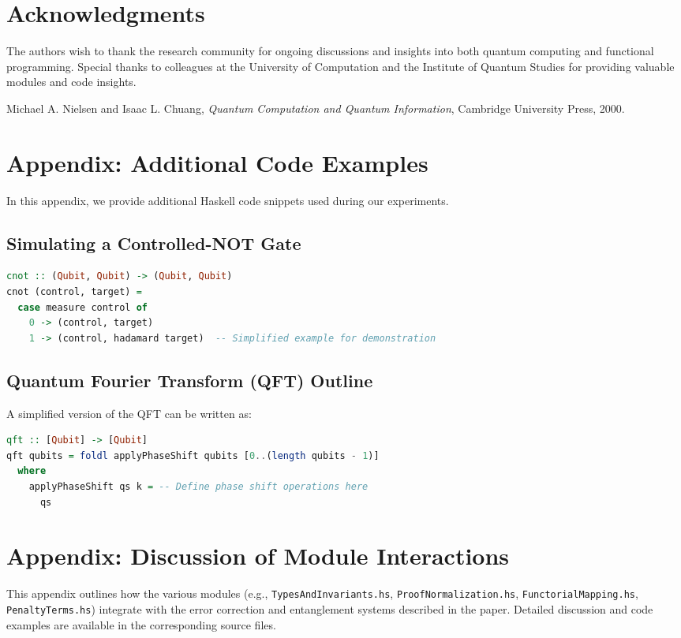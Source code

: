 \documentclass[12pt]{article}
\begin{document}
\section*{Acknowledgments}
The authors wish to thank the research community for ongoing discussions and insights into both quantum computing and functional programming. Special thanks to colleagues at the University of Computation and the Institute of Quantum Studies for providing valuable modules and code insights.

\begin{thebibliography}{9}
Michael A. Nielsen and Isaac L. Chuang, \emph{Quantum Computation and Quantum Information}, Cambridge University Press, 2000.
\end{thebibliography}

\newpage
\appendix

\section{Appendix: Additional Code Examples}
In this appendix, we provide additional Haskell code snippets used during our experiments.

\subsection{Simulating a Controlled-NOT Gate}
\begin{lstlisting}[language=Haskell]
cnot :: (Qubit, Qubit) -> (Qubit, Qubit)
cnot (control, target) =
  case measure control of
    0 -> (control, target)
    1 -> (control, hadamard target)  -- Simplified example for demonstration
\end{lstlisting}

\subsection{Quantum Fourier Transform (QFT) Outline}
A simplified version of the QFT can be written as:
\begin{lstlisting}[language=Haskell]
qft :: [Qubit] -> [Qubit]
qft qubits = foldl applyPhaseShift qubits [0..(length qubits - 1)]
  where
    applyPhaseShift qs k = -- Define phase shift operations here
      qs
\end{lstlisting}

\section{Appendix: Discussion of Module Interactions}
This appendix outlines how the various modules (e.g., \texttt{TypesAndInvariants.hs}, \texttt{ProofNormalization.hs}, \texttt{FunctorialMapping.hs}, \texttt{PenaltyTerms.hs}) integrate with the error correction and entanglement systems described in the paper. Detailed discussion and code examples are available in the corresponding source files.
\end{document}

